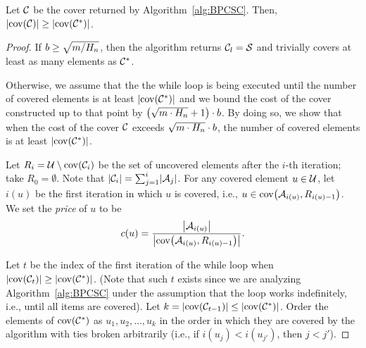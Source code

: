 \begin{lemma}\label{lem:BPCSC-coverage}
    Let $\mathcal{C}$ be the cover returned by Algorithm~\ref{alg:BPCSC}. Then, $\mathopen{}\left| \operatorname{cov}\mathopen{}\left( \mathcal{C} \right) \right| \geq \mathopen{}\left| \operatorname{cov}\mathopen{}\left( \mathcal{C}^{*} \right) \right|$.
\end{lemma}
\begin{proof}
    If $b \geq \sqrt{m/H_n}$, then the algorithm returns $\mathcal{C}_l=\mathcal{S}$ and trivially covers at least as many elements as $\mathcal{C}^{*}$.

    Otherwise, we assume that the the while loop is being executed until the number of covered elements is at least $\mathopen{}\left| \operatorname{cov}\mathopen{}\left( \mathcal{C}^{*} \right) \right|$ and we bound the cost of the cover constructed up to that point by $\mathopen{}\left( \sqrt{m\cdot H_n}+1 \right)\cdot b$. By doing so, we show that when the cost of the cover $\mathcal{C}$ exceeds $\sqrt{m\cdot H_n}\cdot b$, the number of covered elements is at least $\mathopen{}\left| \operatorname{cov}\mathopen{}\left( \mathcal{C}^{*} \right) \right|$.
    
    Let $R_i = \mathcal{U} \setminus \operatorname{cov}\mathopen{}\left( \mathcal{C}_i \right)$ be the set of uncovered elements after the $i$-th iteration; take $R_0=\emptyset$.
    Note that $\mathopen{}\left| \mathcal{C}_i \right| = \sum_{j=1}^{i} \mathopen{}\left| \mathcal{A}_j \right|$. For any covered element $u \in \mathcal{U}$, let $i(u)$ be the first iteration in which $u$ is covered, i.e., $u \in \operatorname{cov}\mathopen{}\left( \mathcal{A}_{i(u)}, R_{i(u)-1} \right)$. We set the \emph{price} of $u$ to be 
    \[c(u) = \frac{\mathopen{}\left| \mathcal{A}_{i(u)} \right|}{\mathopen{}\left| \operatorname{cov}\mathopen{}\left( \mathcal{A}_{i(u)}, R_{i(u)-1} \right) \right|}.
    \]

    Let $t$ be the index of the first iteration of the while loop when $\mathopen{}\left| \operatorname{cov}\mathopen{}\left( \mathcal{C}_{t} \right) \right|\geq\mathopen{}\left| \operatorname{cov}\mathopen{}\left( \mathcal{C}^{*} \right) \right|$.
    (Note that such $t$ exists since we are analyzing Algorithm~\ref{alg:BPCSC} under the assumption that the loop works indefinitely, i.e., until all items are covered).
    Let $k=\mathopen{}\left| \operatorname{cov}\mathopen{}\left( \mathcal{C}_{t-1} \right) \right|\leq\mathopen{}\left| \operatorname{cov}\mathopen{}\left( \mathcal{C}^{*} \right) \right|$.
    Order the elements of $\operatorname{cov}\mathopen{}\left( \mathcal{C}^{*} \right)$ as $u_1, u_2, \ldots, u_k$ in the order in which they are covered by the algorithm with ties broken arbitrarily (i.e., if $i(u_j)<i(u_{j'})$, then $j<j'$).


\end{proof}
